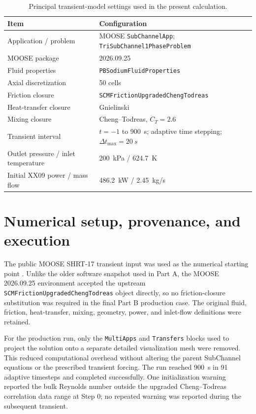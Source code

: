 \documentclass[10pt,a4paper]{article}
\begin{document}
\begin{table}[H]
\centering\small
\caption{Principal transient-model settings used in the present calculation.}
\begin{tabularx}{0.95\linewidth}{@{}lX@{}}
\toprule
Item & Configuration \\
\midrule
Application / problem & MOOSE \texttt{SubChannelApp}; \texttt{TriSubChannel1PhaseProblem} \\
MOOSE package & 2026.09.25 \\
Fluid properties & \texttt{PBSodiumFluidProperties} \parencite{moose_pbsodium} \\
Axial discretization & 50 cells \\
Friction closure & \texttt{SCMFrictionUpgradedChengTodreas} \parencite{moose_ct} \\
Heat-transfer closure & Gnielinski \parencite{gnielinski1975} \\
Mixing closure & Cheng--Todreas, $C_T=2.6$ \\
Transient interval & $t=-1$ to \SI{900}{s}; adaptive time stepping; $\Delta t_{\max}=\SI{20}{s}$ \\
Outlet pressure / inlet temperature & \SI{200}{kPa} / \SI{624.7}{K} \\
Initial XX09 power / mass flow & \SI{486.2}{kW} / \SI{2.45}{kg/s} \\
\bottomrule
\end{tabularx}
\end{table}

\section{Numerical setup, provenance, and execution}

The public MOOSE SHRT-17 transient input was used as the numerical starting point \parencite{moose_ebrii}. Unlike the older software snapshot used in Part A, the MOOSE 2026.09.25 environment accepted the upstream \texttt{SCMFrictionUpgradedChengTodreas} object directly, so no friction-closure substitution was required in the final Part B production case. The original fluid, friction, heat-transfer, mixing, geometry, power, and inlet-flow definitions were retained.

For the production run, only the \texttt{MultiApps} and \texttt{Transfers} blocks used to project the solution onto a separate detailed visualization mesh were removed. This reduced computational overhead without altering the parent SubChannel equations or the prescribed transient forcing. The run reached \SI{900}{s} in 91 adaptive timesteps and completed successfully. One initialization warning reported the bulk Reynolds number outside the upgraded Cheng--Todreas correlation data range at Step 0; no repeated warning was reported during the subsequent transient.
\end{document}
